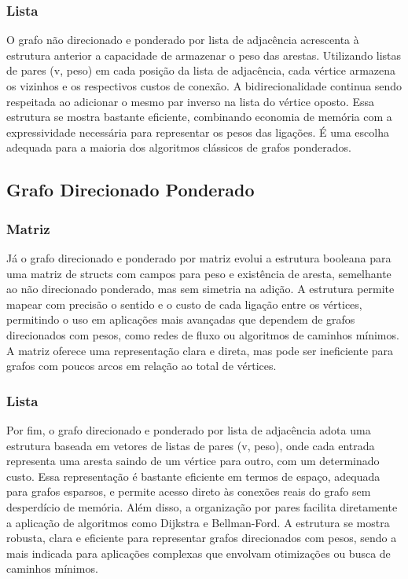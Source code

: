 \documentclass{sbc2023}%
\begin{document}
\subsubsection {Lista}
O grafo não direcionado e ponderado por lista de adjacência acrescenta à estrutura anterior a capacidade de armazenar o peso das arestas. Utilizando listas de pares (v, peso) em cada posição da lista de adjacência, cada vértice armazena os vizinhos e os respectivos custos de conexão. A bidirecionalidade continua sendo respeitada ao adicionar o mesmo par inverso na lista do vértice oposto. Essa estrutura se mostra bastante eficiente, combinando economia de memória com a expressividade necessária para representar os pesos das ligações. É uma escolha adequada para a maioria dos algoritmos clássicos de grafos ponderados.

\subsection{Grafo Direcionado Ponderado}

\subsubsection {Matriz}
Já o grafo direcionado e ponderado por matriz evolui a estrutura booleana para uma matriz de structs com campos para peso e existência de aresta, semelhante ao não direcionado ponderado, mas sem simetria na adição. A estrutura permite mapear com precisão o sentido e o custo de cada ligação entre os vértices, permitindo o uso em aplicações mais avançadas que dependem de grafos direcionados com pesos, como redes de fluxo ou algoritmos de caminhos mínimos. A matriz oferece uma representação clara e direta, mas pode ser ineficiente para grafos com poucos arcos em relação ao total de vértices.
\subsubsection {Lista}
Por fim, o grafo direcionado e ponderado por lista de adjacência adota uma estrutura baseada em vetores de listas de pares (v, peso), onde cada entrada representa uma aresta saindo de um vértice para outro, com um determinado custo. Essa representação é bastante eficiente em termos de espaço, adequada para grafos esparsos, e permite acesso direto às conexões reais do grafo sem desperdício de memória. Além disso, a organização por pares facilita diretamente a aplicação de algoritmos como Dijkstra e Bellman-Ford. A estrutura se mostra robusta, clara e eficiente para representar grafos direcionados com pesos, sendo a mais indicada para aplicações complexas que envolvam otimizações ou busca de caminhos mínimos.
\end{document}
